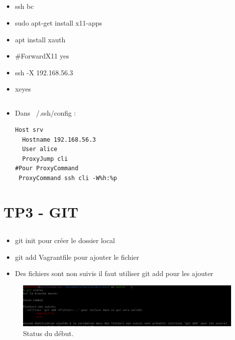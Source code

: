 \documentclass{article}
\begin{document}
\subsection{}
\begin{itemize}
    \item ssh bc
    \item sudo apt-get install x11-apps
    \item apt install xauth
    \item \#ForwardX11 yes
    \item ssh -X 192.168.56.3
    \item xeyes
\end{itemize}
\subsection{}
\begin{itemize}
    \item Dans ~/.ssh/config :
\begin{lstlisting}
Host srv
  Hostname 192.168.56.3
  User alice
  ProxyJump cli
#Pour ProxyCommand
 ProxyCommand ssh cli -W%h:%p
\end{lstlisting}
\end{itemize}

\newpage

\section{TP3 - GIT}

\subsection{}
\begin{itemize}
    \item git init pour créer le dossier local
    \item git add Vagrantfile pour ajouter le fichier
    \item Des fichiers sont non suivis il faut utiliser git add pour les ajouter
\end{itemize}

\begin{figure}[h]
\centering
\includegraphics[width=\textwidth]{screen/git1.png}
\caption{\label{fig:frog}Status du début.}
\end{figure}
\end{document}
